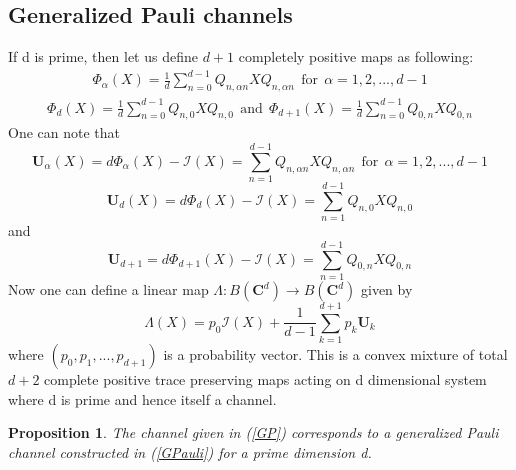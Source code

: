 \documentclass[12pt]{amsart}
\numberwithin{equation}{section}
\newtheorem{proposition}{Proposition}[section]
\begin{document}
\subsection{Generalized Pauli channels}

If d is prime, then let us define $d+1$ completely positive maps as following:
\begin{eqnarray*}
    \Phi_\alpha(X)=\frac{1}{d} \sum_{n=0}^{d-1} Q_{n,\alpha n} X Q_{n,\alpha n} ~~\text{for} ~~\alpha=1,2,...,d-1
\end{eqnarray*}
\begin{eqnarray*}
    \Phi_d(X)=\frac{1}{d}\sum_{n=0}^{d-1} Q_{n,0}XQ_{n,0} ~~\text{and}~~\Phi_{d+1}(X)=\frac{1}{d}\sum_{n=0}^{d-1} Q_{0,n}XQ_{0,n}
\end{eqnarray*}
One can note that \begin{equation}\label{GP1}
    \mathbf{U}_\alpha(X)=d \Phi_{\alpha}(X)-\mathcal{I}(X)=\sum_{n=1}^{d-1} Q_{n,\alpha n}XQ_{n,\alpha n} ~~\text{for} ~~\alpha=1,2,...,d-1 
\end{equation}
\begin{equation}\label{GP2}
    \mathbf{U}_d(X)=d \Phi_d (X)-\mathcal{I}(X)=\sum_{n=1}^{d-1} Q_{n,0 }XQ_{n,0}
\end{equation} and
\begin{equation}\label{GP3}
    \mathbf{U}_{d+1}=d \Phi_{d+1}(X)-\mathcal{I}(X)=\sum_{n=1}^{d-1} Q_{0,n}XQ_{0,n}
\end{equation}
Now one can define a linear map $\Lambda: B\left(\mathbf{C}^d\right) \rightarrow B\left(\mathbf{C}^d\right) $ given by
\begin{equation}\label{GP}
    \Lambda(X)=p_0 \mathcal{I}(X)+\frac{1}{d-1}\sum_{k=1}^{d+1} p_k \mathbf{U}_k
\end{equation}
where $\left(p_0,p_1,...,p_{d+1}\right)$ is a probability vector. This is a convex mixture of total $d+2$ complete positive trace preserving maps acting on d dimensional system where d is prime and hence itself a channel.\\
\begin{proposition}
    The channel given in (\ref{GP}) corresponds to a generalized Pauli channel constructed in (\ref{GPauli}) for a prime dimension d.
\end{proposition}
     
\end{document}
